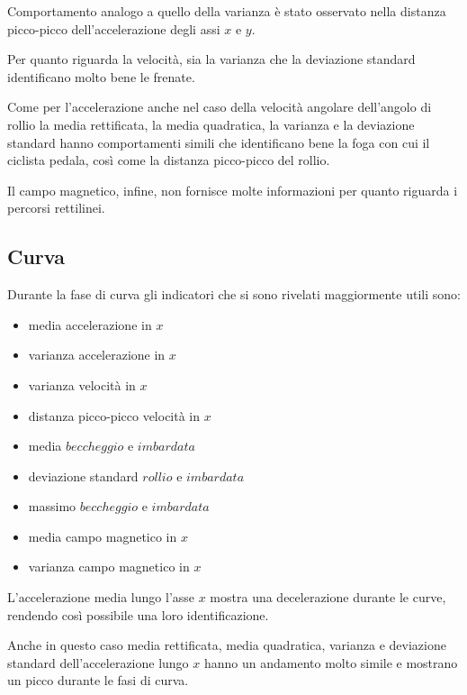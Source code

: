 \documentclass[class=article]{standalone}
\begin{document}
	Comportamento analogo a quello della varianza è stato osservato nella distanza picco-picco dell'accelerazione degli assi \(x\) e \(y\).\hfill\break
	
	Per quanto riguarda la velocità, sia la varianza che la deviazione standard identificano molto bene le frenate.\hfill\break
	
	Come per l'accelerazione anche nel caso della velocità angolare dell'angolo di rollio la media rettificata, la media quadratica, la varianza e la deviazione standard hanno comportamenti simili che identificano bene la foga con cui il ciclista pedala, così come la distanza picco-picco del rollio.\hfill\break
	
	Il campo magnetico, infine, non fornisce molte informazioni per quanto riguarda i percorsi rettilinei.
	
	\subsection{Curva}
	Durante la fase di curva gli indicatori che si sono rivelati maggiormente utili sono:
	\begin{itemize}
		\item media accelerazione in \(x\)
		\item varianza accelerazione in \(x\)
		\item varianza velocità in \(x\)
		\item distanza picco-picco velocità in \(x\)
		\item media \(beccheggio\) e \(imbardata\)
		\item deviazione standard \(rollio\) e \(imbardata\)
		\item massimo \(beccheggio\) e \(imbardata\)
		\item media campo magnetico in \(x\)
		\item varianza campo magnetico in \(x\)

	\end{itemize}
	
	
	L'accelerazione media lungo l'asse \(x\) mostra una decelerazione durante le curve, rendendo così possibile una loro identificazione.
	
	Anche in questo caso media rettificata, media quadratica, varianza e deviazione standard dell'accelerazione lungo \(x\) hanno un andamento molto simile e mostrano un picco durante le fasi di curva.\hfill\break
	
\end{document}
